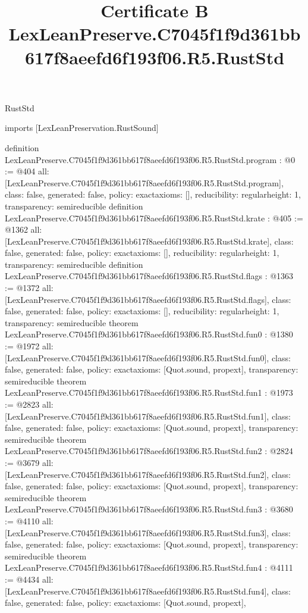 \begin{lexlean}{RustStd}
\title{Certificate B LexLeanPreserve.C7045f1f9d361bb617f8aeefd6f193f06.R5.RustStd}
\begin{coremodule}
imports [LexLeanPreservation.RustSound]

definition LexLeanPreserve.C7045f1f9d361bb617f8aeefd6f193f06.R5.RustStd.program : @0 := @404 {
  all: [LexLeanPreserve.C7045f1f9d361bb617f8aeefd6f193f06.R5.RustStd.program],
  class: false,
  generated: false,
  policy: exact{axioms: []},
  reducibility: regular{height: 1},
  transparency: semireducible
}
definition LexLeanPreserve.C7045f1f9d361bb617f8aeefd6f193f06.R5.RustStd.krate : @405 := @1362 {
  all: [LexLeanPreserve.C7045f1f9d361bb617f8aeefd6f193f06.R5.RustStd.krate],
  class: false,
  generated: false,
  policy: exact{axioms: []},
  reducibility: regular{height: 1},
  transparency: semireducible
}
definition LexLeanPreserve.C7045f1f9d361bb617f8aeefd6f193f06.R5.RustStd.flags : @1363 := @1372 {
  all: [LexLeanPreserve.C7045f1f9d361bb617f8aeefd6f193f06.R5.RustStd.flags],
  class: false,
  generated: false,
  policy: exact{axioms: []},
  reducibility: regular{height: 1},
  transparency: semireducible
}
theorem LexLeanPreserve.C7045f1f9d361bb617f8aeefd6f193f06.R5.RustStd.fun0 : @1380 := @1972 {
  all: [LexLeanPreserve.C7045f1f9d361bb617f8aeefd6f193f06.R5.RustStd.fun0],
  class: false,
  generated: false,
  policy: exact{axioms: [Quot.sound, propext]},
  transparency: semireducible
}
theorem LexLeanPreserve.C7045f1f9d361bb617f8aeefd6f193f06.R5.RustStd.fun1 : @1973 := @2823 {
  all: [LexLeanPreserve.C7045f1f9d361bb617f8aeefd6f193f06.R5.RustStd.fun1],
  class: false,
  generated: false,
  policy: exact{axioms: [Quot.sound, propext]},
  transparency: semireducible
}
theorem LexLeanPreserve.C7045f1f9d361bb617f8aeefd6f193f06.R5.RustStd.fun2 : @2824 := @3679 {
  all: [LexLeanPreserve.C7045f1f9d361bb617f8aeefd6f193f06.R5.RustStd.fun2],
  class: false,
  generated: false,
  policy: exact{axioms: [Quot.sound, propext]},
  transparency: semireducible
}
theorem LexLeanPreserve.C7045f1f9d361bb617f8aeefd6f193f06.R5.RustStd.fun3 : @3680 := @4110 {
  all: [LexLeanPreserve.C7045f1f9d361bb617f8aeefd6f193f06.R5.RustStd.fun3],
  class: false,
  generated: false,
  policy: exact{axioms: [Quot.sound, propext]},
  transparency: semireducible
}
theorem LexLeanPreserve.C7045f1f9d361bb617f8aeefd6f193f06.R5.RustStd.fun4 : @4111 := @4434 {
  all: [LexLeanPreserve.C7045f1f9d361bb617f8aeefd6f193f06.R5.RustStd.fun4],
  class: false,
  generated: false,
  policy: exact{axioms: [Quot.sound, propext]},
}
\end{coremodule}
\end{lexlean}
